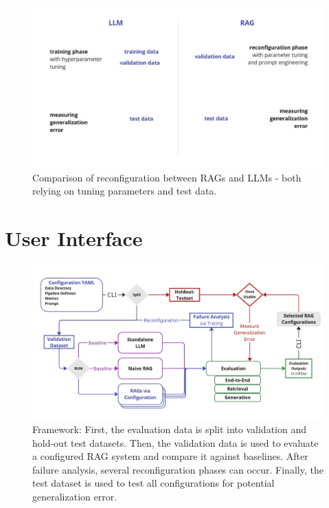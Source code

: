 \begin{figure}[!ht] 
  \centering
  \includegraphics[width=\textwidth]{images/RAGvsLLM-tuning.pdf}
  \caption{Comparison of reconfiguration between RAGs and LLMs - both relying on tuning parameters and test data.}
  \label{fig:tuning}
\end{figure}

\section{User Interface}\label{sec:ui}

\begin{figure}[!ht]
  \centering
  \includegraphics[width=\textwidth]{images/FrameworkFull.pdf}
  \caption{Framework: First, the evaluation data is split into validation and hold-out test datasets. Then, the validation data is used to evaluate a configured RAG system and compare it against baselines. After failure analysis, several reconfiguration phases can occur. Finally, the test dataset is used to test all configurations for potential generalization error.}
  \label{fig:framework-full}
\end{figure}


